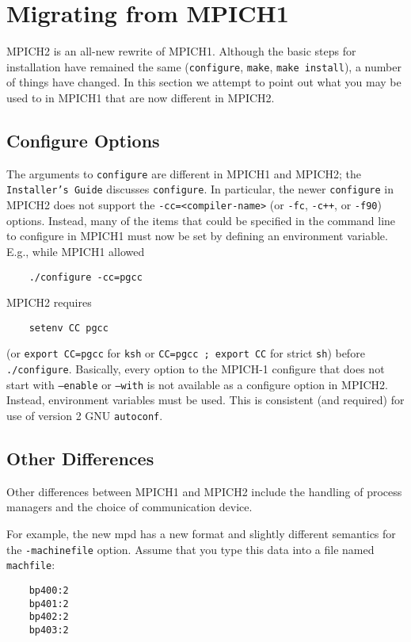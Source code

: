 \documentclass[dvipdfm,11pt]{article}
\begin{document}
\section{Migrating from MPICH1}
\label{sec:migrating}

MPICH2 is an all-new rewrite of MPICH1.  Although the basic steps for
installation have remained the same (\texttt{configure}, \texttt{make},
\texttt{make install}), a number of things have changed.  In this
section we attempt to point out what you may be used to in MPICH1 that
are now different in MPICH2.

\subsection{Configure Options}
\label{sec:configure-options}

The arguments to \texttt{configure} are different in MPICH1 and MPICH2;
the \texttt{Installer's Guide} discusses \texttt{configure}.  In
particular, the newer \texttt{configure} in MPICH2 does not support the
\verb+-cc=<compiler-name>+ (or \texttt{-fc}, \texttt{-c++}, or
\texttt{-f90}) options.  Instead, many of the items that could be
specified in the command line to configure in MPICH1 must now be set by
defining an environment variable.  E.g., while MPICH1 allowed
\begin{verbatim}
    ./configure -cc=pgcc
\end{verbatim}
MPICH2 requires
\begin{verbatim}
    setenv CC pgcc
\end{verbatim}
(or \verb+export CC=pgcc+ for \texttt{ksh} or \verb+CC=pgcc ; export CC+
for strict \texttt{sh}) before \texttt{./configure}.  Basically, every
option to the MPICH-1 configure that does not start with
\texttt{--enable} or \texttt{--with} is not available as a configure
option in MPICH2.  Instead, environment variables must be used.  This is
consistent (and required) for use of version 2 GNU \texttt{autoconf}.

\subsection{Other Differences}
Other differences between MPICH1 and MPICH2 include the handling of
process managers and the choice of communication device.

For example, the new mpd has a new format and slightly different
semantics for the \texttt{-machinefile} option.  Assume that you type this
data into a file named \texttt{machfile}:
\begin{verbatim}
    bp400:2
    bp401:2
    bp402:2
    bp403:2
\end{verbatim}
\end{document}
